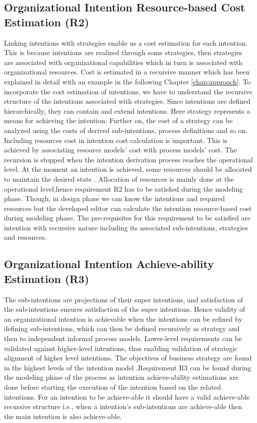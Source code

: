 \subsection{Organizational Intention Resource-based Cost Estimation (R2)}
Linking intentions with strategies enable us a cost estimation for each intention. This is because intentions are realized through some strategies, then strategies are associated with organizational capabilities which in turn is associated with organizational resources. Cost is estimated in a recursive manner which has been explained in detail with an example in the following Chapter \ref{chap:approach}. To incorporate the cost estimation of intentions, we have to understand the recursive structure of the intentions associated with strategies. Since intentions are defined hierarchically, they can contain and extend intentions. Here strategy represents a means for achieving the intention. Further on, the cost of a strategy can be analyzed using the costs of derived sub-intentions, process definitions and so on. Including resources cost in intention cost calculation is important. This is achieved by associating resource models' cost with process models' cost. The recursion is stopped when the intention derivation process reaches the operational level. At the moment an intention is achieved, some resources should be allocated to maintain the desired state \cite{Mandic2010}. Allocation of resources is mainly done at the operational level,hence requirement R2 has to be satisfied during the modeling phase. Though, in design phase we can know the intentions and required resources but the developed editor can calculate the intention resource-based cost during modeling phase. The pre-requisites for this requirement to be satisfied are intention with recursive nature including its associated sub-intentions, strategies and resources.  

\subsection{Organizational Intention Achieve-ability Estimation (R3)}
The sub-intentions are projections of their super intentions, and satisfaction of the sub-intentions ensures satisfaction of the super intentions. Hence validity of an organizational intention is achievable when the intentions can be refined by defining sub-intentions, which can then be defined recursively as strategy and then to independent informal process models. Lower-level requirements can be validated against higher-level intentions, thus enabling validation of strategic alignment of  higher level intentions. The objectives of business strategy are found in the highest levels of the intention model \cite{Bleistein2006}.Requirement R3  can be found during the modeling phase of the process  as intention achieve-ability estimations are done before starting the execution of the intention based on the related intentions. For an intention to be achieve-able it should have a valid achieve-able recursive structure i.e., when a intention's sub-intentions are achieve-able then the main intention is also achieve-able. 


